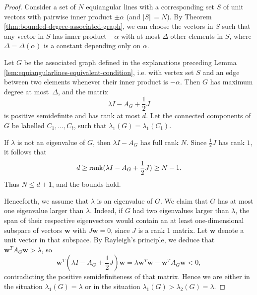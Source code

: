 \begin{proof}
    Consider a set of $N$ equiangular lines with a corresponding set $S$ of unit vectors with pairwise inner product $\pm \alpha$ (and $|S|\, = N$).
    By Theorem \ref{thm:bounded-degree-associated-graph}, we can choose the vectors in $S$ such that any vector in $S$ has inner product $-\alpha$ with at most $\Delta$ other elements in $S$, where $\Delta = \Delta (\alpha)$ is a constant depending only on $\alpha$.
    
    Let $G$ be the associated graph defined in the explanations preceding Lemma \ref{lem:equiangularlines-equivalent-condition}, i.e. with vertex set $S$ and an edge between two elements whenever their inner product is $-\alpha$. 
    Then $G$ has maximum degree at \mbox{most $\Delta$}, and the matrix 
    \begin{equation*}
        \lambda I - A_G + \frac{1}{2} J 
    \end{equation*}
    is positive semidefinite and has rank at most $d$.
    Let the connected components of $G$ be labelled $C_1, \dots, C_t$, such that $\lambda_1 (G) = \lambda_1 (C_1)$.

    If $\lambda$ is not an eigenvalue of $G$, then $\lambda I - A_G$ has full rank $N$. Since $\frac{1}{2}J$ has rank $1$, it follows that 
    \begin{equation*}
        d \ge \operatorname{rank} (\lambda I - A_G + \frac{1}{2} J) \ge N - 1.
    \end{equation*}
    Thus $N \le d + 1$, and the bounds hold.

    Henceforth, we assume that $\lambda$ is an eigenvalue of $G$.
    We claim that $G$ has at most one eigenvalue larger than $\lambda$. 
    Indeed, if $G$ had two eigenvalues larger than $\lambda$, the span of their respective eigenvectors would contain an at least one-dimensional subspace of vectors $\bm{w}$ with $J\bm{w} = 0$, since $J$ is a rank 1 matrix.
    Let $\bm{w}$ denote a unit vector in that subspace. By Rayleigh's principle, we deduce that $\bm{w}^T A_G \bm{w} > \lambda$, so
    \begin{equation*}
        \bm{w}^T (\lambda I - A_G + \frac{1}{2} J) \bm{w} = \lambda \bm{w}^T \bm{w} - \bm{w}^T A_G \bm{w} < 0,
    \end{equation*}
    contradicting the positive semidefiniteness of that matrix. 
    Hence we are either in the situation $\lambda_1 (G) = \lambda$ or in the situation $\lambda_1(G)  > \lambda_2(G) = \lambda$.
    

\end{proof}
